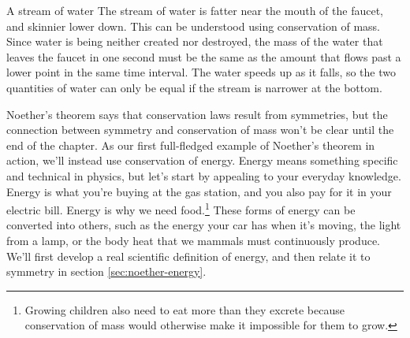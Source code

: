 \begin{eg}{A stream of water}\label{eg:faucet}
The stream of water is fatter near the mouth of the faucet, and skinnier lower down. This can be understood
using conservation of mass. Since water is being neither created nor destroyed, the mass of the
water that leaves the faucet in one second must be the same as the amount that flows past a lower
point in the same time interval. The water speeds up as it falls, so the two quantities of water can
only be equal if the stream is narrower at the bottom.
\end{eg}

Noether's theorem says that conservation laws result from symmetries, but the connection between
symmetry and conservation of mass won't be clear until the end of the chapter. As our first full-fledged
example of Noether's theorem in action, we'll instead use conservation of energy.
Energy means something specific and technical in physics, but let's start by appealing to your
everyday knowledge. Energy is what you're buying at the gas station, and you also pay for
it in your electric bill. Energy is why we need food.\footnote{Growing
children also need to eat more than they excrete because conservation of mass would
otherwise make it impossible for them to grow.} These forms of energy can be converted into
others, such as the energy your car has when it's moving, the light from a lamp,
or the body heat that we mammals must continuously produce. We'll first develop a
real scientific definition of energy, and then relate it to symmetry in section
\ref{sec:noether-energy}.

